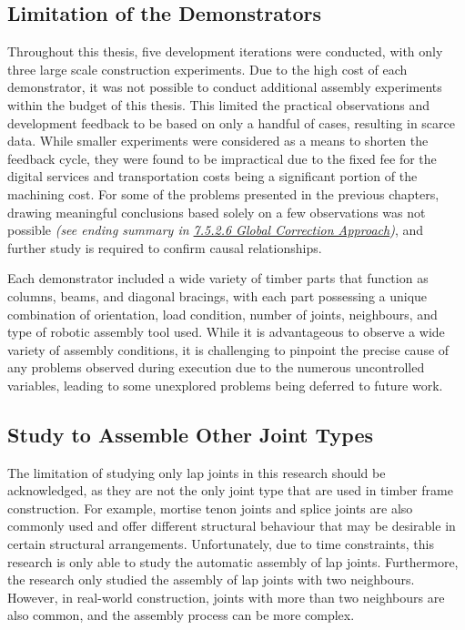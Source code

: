 \subsection{Limitation of the Demonstrators}
\label{subsection:limitation_of_the_demonstrators}

Throughout this thesis, five development iterations were conducted, with only three large scale construction experiments. Due to the high cost of each demonstrator, it was not possible to conduct additional assembly experiments within the budget of this thesis. This limited the practical observations and development feedback to be based on only a handful of cases, resulting in scarce data. While smaller experiments were considered as a means to shorten the feedback cycle, they were found to be impractical due to the fixed fee for the digital services and transportation costs being a significant portion of the machining cost. For some of the problems presented in the previous chapters, drawing meaningful conclusions based solely on a few observations was not possible \textit{(see ending summary in \ul{7.5.2.6 Global Correction Approach})}, and further study is required to confirm causal relationships. 

Each demonstrator included a wide variety of timber parts that function as columns, beams, and diagonal bracings, with each part possessing a unique combination of orientation, load condition, number of joints, neighbours, and type of robotic assembly tool used. While it is advantageous to observe a wide variety of assembly conditions, it is challenging to pinpoint the precise cause of any problems observed during execution due to the numerous uncontrolled variables, leading to some unexplored problems being deferred to future work.

\subsection{Study to Assemble Other Joint Types}
\label{subsection:study_to_assemble_other_joint_types}

The limitation of studying only lap joints in this research should be acknowledged, as they are not the only joint type that are used in timber frame construction. For example, mortise tenon joints and splice joints are also commonly used and offer different structural behaviour that may be desirable in certain structural arrangements. Unfortunately, due to time constraints, this research is only able to study the automatic assembly of lap joints. Furthermore, the research only studied the assembly of lap joints with two neighbours. However, in real-world construction, joints with more than two neighbours are also common, and the assembly process can be more complex. 


